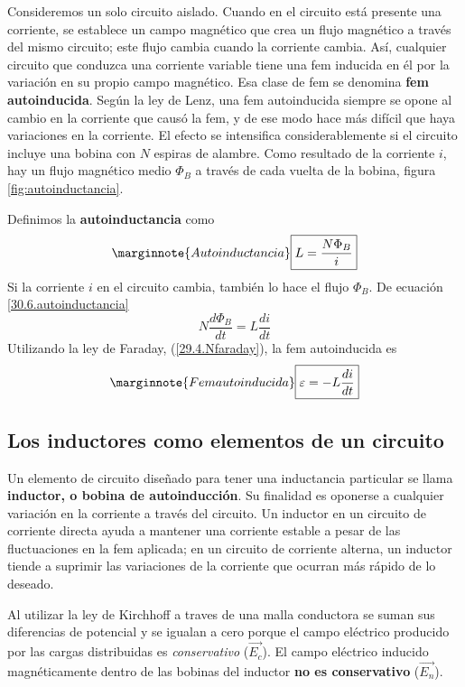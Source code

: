 Consideremos un solo circuito aislado. Cuando en el circuito está presente una corriente, se establece un campo magnético que crea un flujo magnético a través del mismo circuito; este flujo cambia cuando la corriente cambia. Así, cualquier circuito que conduzca una corriente variable tiene una fem inducida en él por la variación en su propio campo magnético. Esa clase de fem se denomina \textbf{fem autoinducida}. Según la ley de Lenz, una fem autoinducida siempre se opone al cambio en la corriente que causó la fem, y de ese modo hace más difícil que haya variaciones en la corriente. El efecto se intensifica considerablemente si el circuito incluye una bobina con $N$ espiras de alambre. Como resultado de la corriente $i$, hay un flujo magnético medio $\Phi_B$ a través de cada vuelta de la bobina, figura \ref{fig:autoinductancia}.

Definimos la \textbf{autoinductancia} como
\begin{equation}\label{30.6.autoinductancia}\marginnote{Autoinductancia}
\boxed{L=\frac{N\Phi_B}{i}}
\end{equation}
Si la corriente $i$ en el circuito cambia, también lo hace el flujo $\Phi_B$. De ecuación \ref{30.6.autoinductancia} $$N\frac{d\Phi_B}{dt}=L\frac{di}{dt}$$ Utilizando la ley de Faraday, (\ref{29.4.Nfaraday}), la fem autoinducida es
\begin{equation}\label{30.7}\marginnote{Fem autoinducida}
\boxed{\varepsilon=-L\frac{di}{dt}}
\end{equation}

\subsection{Los inductores como elementos de un circuito}
Un elemento de circuito diseñado para tener una inductancia particular se llama \textbf{inductor, o bobina de autoinducción}. Su finalidad es oponerse a cualquier variación en la corriente a través del circuito. Un inductor en un circuito de corriente directa ayuda a mantener una corriente estable a pesar de las fluctuaciones en la fem aplicada; en un circuito de corriente alterna, un inductor tiende a suprimir las variaciones de la corriente que ocurran más rápido de lo deseado.

Al utilizar la ley de Kirchhoff a traves de una malla conductora se suman sus diferencias de potencial y se igualan a cero porque el campo eléctrico producido por las cargas distribuidas es \textit{conservativo} ($\vec{E_c}$). El campo eléctrico inducido magnéticamente dentro de las bobinas del inductor \textbf{no es conservativo} ($\vec{E_n}$).


